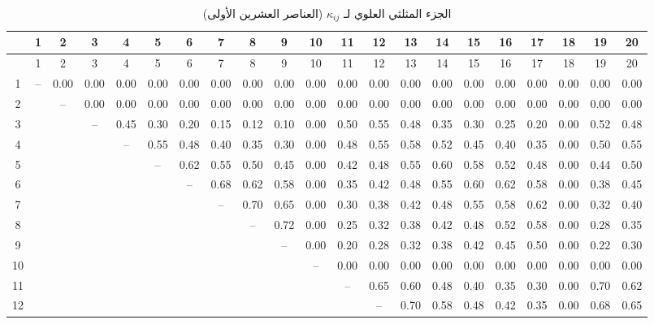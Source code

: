 \documentclass[11pt,a4paper]{article}
\begin{document}
\begin{otherlanguage}{arabic}
		{\tiny
			\begin{longtable}{c|*{20}{c}}
				\caption{الجزء المثلثي العلوي لـ \(\kappa_{ij}\) (العناصر العشرين الأولى)} \label{tab:kappa-full-20} \\
				\toprule
				& 1 & 2 & 3 & 4 & 5 & 6 & 7 & 8 & 9 & 10 & 11 & 12 & 13 & 14 & 15 & 16 & 17 & 18 & 19 & 20 \\
				\midrule
				\endfirsthead
				\toprule
				& 1 & 2 & 3 & 4 & 5 & 6 & 7 & 8 & 9 & 10 & 11 & 12 & 13 & 14 & 15 & 16 & 17 & 18 & 19 & 20 \\
				\midrule
				\endhead
				1  & – & 0.00 & 0.00 & 0.00 & 0.00 & 0.00 & 0.00 & 0.00 & 0.00 & 0.00 & 0.00 & 0.00 & 0.00 & 0.00 & 0.00 & 0.00 & 0.00 & 0.00 & 0.00 & 0.00 \\
				2  &   & – & 0.00 & 0.00 & 0.00 & 0.00 & 0.00 & 0.00 & 0.00 & 0.00 & 0.00 & 0.00 & 0.00 & 0.00 & 0.00 & 0.00 & 0.00 & 0.00 & 0.00 & 0.00 \\
				3  &   &   & – & 0.45 & 0.30 & 0.20 & 0.15 & 0.12 & 0.10 & 0.00 & 0.50 & 0.55 & 0.48 & 0.35 & 0.30 & 0.25 & 0.20 & 0.00 & 0.52 & 0.48 \\
				4  &   &   &   & – & 0.55 & 0.48 & 0.40 & 0.35 & 0.30 & 0.00 & 0.48 & 0.55 & 0.58 & 0.52 & 0.45 & 0.40 & 0.35 & 0.00 & 0.50 & 0.55 \\
				5  &   &   &   &   & – & 0.62 & 0.55 & 0.50 & 0.45 & 0.00 & 0.42 & 0.48 & 0.55 & 0.60 & 0.58 & 0.52 & 0.48 & 0.00 & 0.44 & 0.50 \\
				6  &   &   &   &   &   & – & 0.68 & 0.62 & 0.58 & 0.00 & 0.35 & 0.42 & 0.48 & 0.55 & 0.60 & 0.62 & 0.58 & 0.00 & 0.38 & 0.45 \\
				7  &   &   &   &   &   &   & – & 0.70 & 0.65 & 0.00 & 0.30 & 0.38 & 0.42 & 0.48 & 0.55 & 0.58 & 0.62 & 0.00 & 0.32 & 0.40 \\
				8  &   &   &   &   &   &   &   & – & 0.72 & 0.00 & 0.25 & 0.32 & 0.38 & 0.42 & 0.48 & 0.52 & 0.58 & 0.00 & 0.28 & 0.35 \\
				9  &   &   &   &   &   &   &   &   & – & 0.00 & 0.20 & 0.28 & 0.32 & 0.38 & 0.42 & 0.45 & 0.50 & 0.00 & 0.22 & 0.30 \\
				10 &   &   &   &   &   &   &   &   &   & – & 0.00 & 0.00 & 0.00 & 0.00 & 0.00 & 0.00 & 0.00 & 0.00 & 0.00 & 0.00 \\
				11 &   &   &   &   &   &   &   &   &   &   & – & 0.65 & 0.60 & 0.48 & 0.40 & 0.35 & 0.30 & 0.00 & 0.70 & 0.62 \\
				12 &   &   &   &   &   &   &   &   &   &   &   & – & 0.70 & 0.58 & 0.48 & 0.42 & 0.35 & 0.00 & 0.68 & 0.65 \\

\end{longtable}}
\end{otherlanguage}
\end{document}
